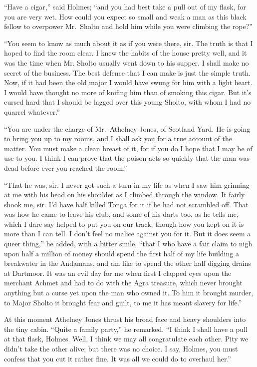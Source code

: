 \documentclass[12pt,english,oneside]{book}
\begin{document}
{}``Have a cigar,'' said Holmes; {}``and you had best take a pull
out of my flask, for you are very wet. How could you expect so small
and weak a man as this black fellow to overpower Mr.\ Sholto and
hold him while you were climbing the rope?''

{}``You seem to know as much about it as if you were there, sir.
The truth is that I hoped to find the room clear. I knew the habits
of the house pretty well, and it was the time when Mr. Sholto usually
went down to his supper. I shall make no secret of the business. The
best defence that I can make is just the simple truth. Now, if it
had been the old major I would have swung for him with a light heart.
I would have thought no more of knifing him than of smoking this cigar.
But it's cursed hard that I should be lagged over this young Sholto,
with whom I had no quarrel whatever.''

{}``You are under the charge of Mr.\ Athelney Jones, of Scotland
Yard. He is going to bring you up to my rooms, and I shall ask you
for a true account of the matter. You must make a clean breast of
it, for if you do I hope that I may be of use to you. I think I can
prove that the poison acts so quickly that the man was dead before
ever you reached the room.''

{}``That he was, sir. I never got such a turn in my life as when
I saw him grinning at me with his head on his shoulder as I climbed
through the window. It fairly shook me, sir. I'd have half killed
Tonga for it if he had not scrambled off. That was how he came to
leave his club, and some of his darts too, as he tells me, which I
dare say helped to put you on our track; though how you kept on it
is more than I can tell. I don't feel no malice against you for it.
But it does seem a queer thing,'' he added, with a bitter smile,
{}``that I who have a fair claim to nigh upon half a million of money
should spend the first half of my life building a breakwater in the
Andamans, and am like to spend the other half digging drains at Dartmoor.
It was an evil day for me when first I clapped eyes upon the merchant
Achmet and had to do with the Agra treasure, which never brought anything
but a curse yet upon the man who owned it. To him it brought murder,
to Major Sholto it brought fear and guilt, to me it has meant slavery
for life.''

At this moment Athelney Jones thrust his broad face and heavy shoulders
into the tiny cabin. {}``Quite a family party,'' he remarked. {}``I
think I shall have a pull at that flask, Holmes. Well, I think we
may all congratulate each other. Pity we didn't take the other alive;
but there was no choice. I say, Holmes, you must confess that you
cut it rather fine. It was all we could do to overhaul her.''
\end{document}
